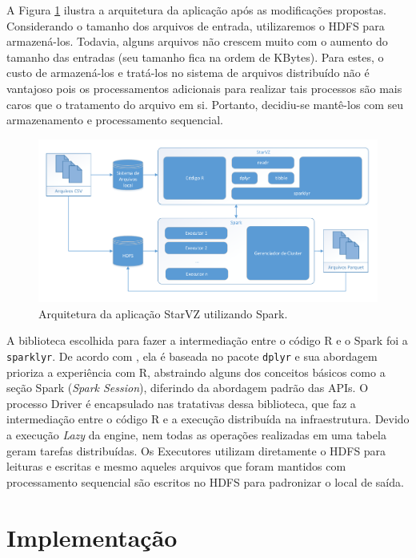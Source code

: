 A Figura \ref{fig:starvz-app-spark} ilustra a arquitetura da aplicação após as 
modificações propostas. Considerando o tamanho dos arquivos de entrada, 
utilizaremos o HDFS para armazená-los. Todavia, alguns arquivos não crescem 
muito com o aumento do tamanho das entradas (seu tamanho fica na ordem de 
KBytes). Para estes, o custo de armazená-los e tratá-los no 
sistema de arquivos distribuído não é vantajoso pois os processamentos 
adicionais para realizar tais processos são mais caros que o tratamento do 
arquivo em si. Portanto, decidiu-se mantê-los com seu armazenamento e 
processamento sequencial.

\begin{figure}[ht]
 \centerline{\includegraphics[width=1\textwidth]{./img/starvz-arch-spark.pdf}}
 \caption{Arquitetura da aplicação StarVZ utilizando Spark.}
 \label{fig:starvz-app-spark}
\end{figure}


A biblioteca escolhida para fazer a intermediação entre o código R e o Spark 
foi a \texttt{sparklyr}. De acordo com \citet{ref:sparkbook}, ela é 
baseada no pacote \texttt{dplyr} e sua abordagem prioriza a experiência com R, 
abstraindo alguns dos conceitos básicos como a seção Spark (\emph{Spark 
Session}), diferindo da abordagem padrão das APIs. O processo Driver é 
encapsulado nas tratativas dessa biblioteca, que faz a intermediação entre o 
código R e a execução distribuída na infraestrutura. Devido a execução 
\emph{Lazy} da engine, nem todas as operações realizadas em uma tabela geram 
tarefas distribuídas. Os Executores utilizam diretamente o HDFS para leituras e 
escritas e mesmo aqueles arquivos que foram mantidos com processamento 
sequencial são escritos no HDFS para padronizar o local de saída.


\section{Implementação} \label{sect:implement}

